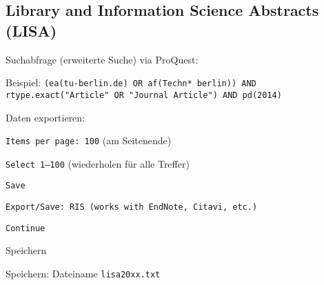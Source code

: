 \subsection*{Library and Information Science Abstracts (LISA)}
\begin{compactitem}
\item Suchabfrage (erweiterte Suche) via ProQuest: 
	\begin{compactitem}
	\item Beispiel: \texttt{(ea(tu-berlin.de) OR af(Techn* berlin)) AND rtype.exact\newline("{}Article"{} OR "{}Journal Article"{}) AND pd(2014)}
	\end{compactitem}
\item Daten exportieren: 
\begin{compactitem}
    \item \texttt{Items per page: 100} (am Seitenende)
    \item \texttt{Select 1--100} (wiederholen für alle Treffer)
    \item \texttt{Save}
    \item \texttt{Export/Save: RIS (works with EndNote, Citavi, etc.)}
    \item \texttt{Continue}
    \item Speichern
	\end{compactitem}
\item Speichern: Dateiname \texttt{lisa20xx.txt}
\end{compactitem}

